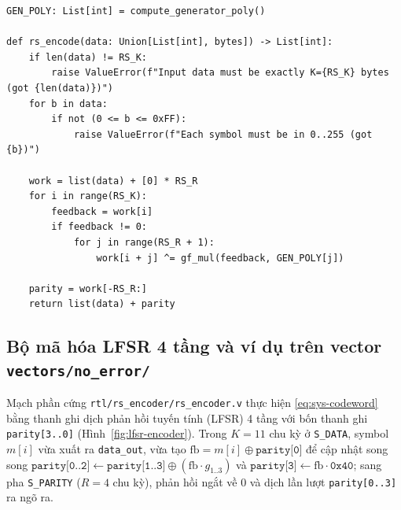 \documentclass[11pt,a4paper]{report}
\begin{document}
\begin{lstlisting}[style=pythonstyle, caption={Hàm mã hóa systematic \texttt{rs\_encode} trong \texttt{model/rs\_reference.py}}, label={lst:rs-encode}]
GEN_POLY: List[int] = compute_generator_poly()

def rs_encode(data: Union[List[int], bytes]) -> List[int]:
    if len(data) != RS_K:
        raise ValueError(f"Input data must be exactly K={RS_K} bytes (got {len(data)})")
    for b in data:
        if not (0 <= b <= 0xFF):
            raise ValueError(f"Each symbol must be in 0..255 (got {b})")

    work = list(data) + [0] * RS_R
    for i in range(RS_K):
        feedback = work[i]
        if feedback != 0:
            for j in range(RS_R + 1):
                work[i + j] ^= gf_mul(feedback, GEN_POLY[j])

    parity = work[-RS_R:]
    return list(data) + parity
\end{lstlisting}

\subsection{Bộ mã hóa LFSR 4 tầng và ví dụ trên vector \texttt{vectors/no\_error/}}

Mạch phần cứng \texttt{rtl/rs\_encoder/rs\_encoder.v} thực hiện \eqref{eq:sys-codeword} bằng thanh ghi dịch phản hồi tuyến tính (LFSR) 4 tầng với bốn thanh ghi \texttt{parity[3..0]} (Hình~\ref{fig:lfsr-encoder}). Trong $K=11$ chu kỳ ở \texttt{S\_DATA}, symbol $m[i]$ vừa xuất ra \texttt{data\_out}, vừa tạo $\text{fb} = m[i] \oplus \texttt{parity[0]}$ để cập nhật song song $\texttt{parity[0..2]} \leftarrow \texttt{parity[1..3]} \oplus (\text{fb}\cdot g_{1..3})$ và $\texttt{parity[3]} \leftarrow \text{fb}\cdot\texttt{0x40}$; sang pha \texttt{S\_PARITY} ($R=4$ chu kỳ), phản hồi ngắt về $0$ và dịch lần lượt \texttt{parity[0..3]} ra ngõ ra.
\end{document}
